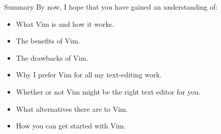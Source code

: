 \documentclass[]{beamer}
\begin{document}
\begin{frame}{Summary}
    By now, I hope that you have gained an understanding of:
    \begin{itemize}
        \item   What Vim is and how it works.
        \item   The benefits of Vim.
        \item   The drawbacks of Vim.
        \item   Why I prefer Vim for all my text-editing work.
        \item   Whether or not Vim might be the right text editor for you.
        \item   What alternatives there are to Vim.
        \item   How you can get started with Vim.
    \end{itemize}
\end{frame}
\end{document}
